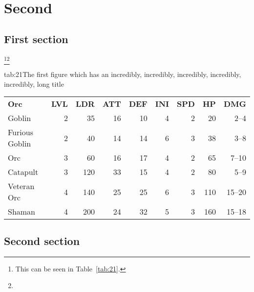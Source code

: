 \chapter{Second}
\lipsum[10]
\section{First section}
\lipsum[10-11]\footnote{This can be seen in Table~\ref{tab:21}.}\footnote{\lipsum[12]}
\begin{singletable}{tab:21}{The first figure which has an incredibly, incredibly, incredibly, incredibly, incredibly, long title}{\lipsum[13]}
  \begin{tabular}{lrrrrrrrr}
    \textbf{Orc} & \textbf{LVL} & \textbf{LDR} & \textbf{ATT} & \textbf{DEF} & \textbf{INI} & \textbf{SPD} & \textbf{HP} & \textbf{DMG} \\ \rule{0pt}{3ex}%
    Goblin         & 2 &  35 & 16 & 10 & 4 & 2 &  20 &  2--4  \\
    Furious Goblin & 2 &  40 & 14 & 14 & 6 & 3 &  38 &  3--8  \\
    Orc            & 3 &  60 & 16 & 17 & 4 & 2 &  65 &  7--10 \\ \rule{0pt}{3ex}%
    Catapult       & 3 & 120 & 33 & 15 & 4 & 2 &  80 &  5--9  \\
    Veteran Orc    & 4 & 140 & 25 & 25 & 6 & 3 & 110 & 15--20 \\
    Shaman         & 4 & 200 & 24 & 32 & 5 & 3 & 160 & 15--18 \\
  \end{tabular}
\end{singletable}
\section{Second section}
